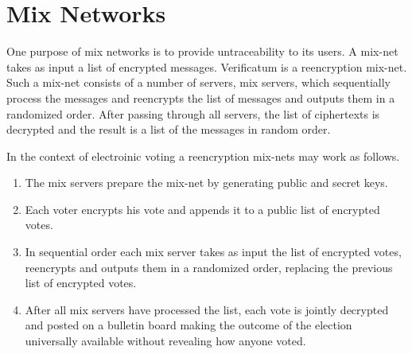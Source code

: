 \documentclass[18pt,a4paper]{article}
\begin{document}
\section*{Mix Networks}

One purpose of mix networks is to provide untraceability to its
users. A mix-net takes as input a list of encrypted
messages. Verificatum is a reencryption mix-net. Such a mix-net
consists of a number of servers, mix servers, which sequentially
process the messages and reencrypts the list of messages and outputs
them in a randomized order. After passing through all servers, the
list of ciphertexts is decrypted and the result is a list of the
messages in random order.

In the context of electroinic voting a reencryption mix-nets may work
as follows.
\begin{enumerate}
\item The mix servers prepare the mix-net by generating public and
  secret keys.
\item Each voter encrypts his vote and appends it to a public list of
  encrypted votes.
\item In sequential order each mix server takes as input the list of
  encrypted votes, reencrypts and outputs them in a randomized order,
  replacing the previous list of encrypted votes.
\item After all mix servers have processed the list, each vote is
  jointly decrypted and posted on a bulletin board making the outcome
  of the election universally available without revealing how anyone
  voted.
\end{enumerate}
\end{document}
